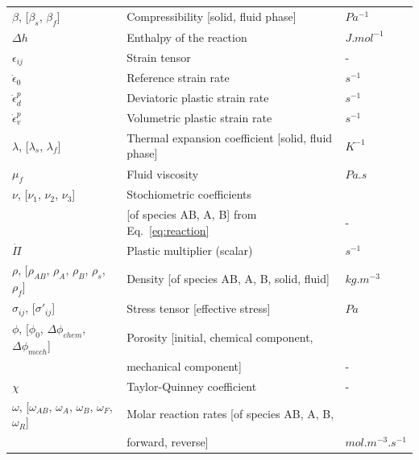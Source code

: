 \documentclass[]{scrreprt}
\begin{document}
\begin{table}
\begin{tabular}{lll}
\hline
$\beta$, [$\beta_s$, $\beta_f$] & Compressibility [solid, fluid phase] & $Pa^{-1}$ \\
$\Delta h$ & Enthalpy of the reaction & $J.mol^{-1}$ \\
$\epsilon_{ij}$ & Strain tensor & - \\
$\dot \epsilon_0$ & Reference strain rate & $s^{-1}$ \\
$\dot \epsilon^{p}_{d}$ & Deviatoric plastic strain rate & $s^{-1}$ \\
$\dot \epsilon^{p}_{v}$ & Volumetric plastic strain rate & $s^{-1}$ \\
$\lambda$, [$\lambda_s$, $\lambda_f$] & Thermal expansion coefficient [solid, fluid phase] & $K^{-1}$ \\
$\mu_f$ & Fluid viscosity & $Pa.s$ \\
$\nu$, [$\nu_{1}$, $\nu_{2}$, $\nu_{3}$] & Stochiometric coefficients \\ & [of species AB, A, B] from Eq.~\ref{eq:reaction}& - \\
$\dot\Pi$ & Plastic multiplier (scalar) & $s^{-1}$ \\
$\rho$, [$\rho_{AB}$, $\rho_{A}$, $\rho_{B}$, $\rho_{s}$, $\rho_{f}$] & Density [of species AB, A, B, solid, fluid] & $kg.m^{-3}$ \\
$\sigma_{ij}$, [$\sigma'_{ij}$] & Stress tensor [effective stress] & $Pa$ \\
$\phi$, [$\phi_0$, $\Delta\phi_{chem}$, $\Delta\phi_{mech}$] & Porosity [initial, chemical component, \\ & mechanical component] & - \\
$\chi$ & Taylor-Quinney coefficient & - \\
$\omega$, [$\omega_{AB}$, $\omega_{A}$, $\omega_{B}$, $\omega_{F}$, $\omega_{R}$] & Molar reaction rates [of species AB, A, B, \\ & forward, reverse] & $mol.m^{-3}.s^{-1}$ \\


\end{tabular}
\end{table}
\end{document}
